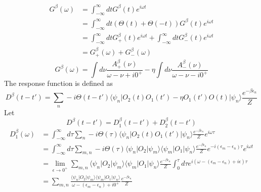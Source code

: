 \documentclass[a4paper,11pt]{article}
\begin{document}
\begin{equation*}
  \begin{split}
     G^\beta(\omega)&=\int_{-\infty}^{\infty}dtG^\beta(t)e^{i\omega t}\\
     &=\int_{-\infty}^{\infty}dt(\Theta(t)+\Theta(-t))G^\beta(t)e^{i\omega t}\\
     &=\int_{-\infty}^{\infty}dtG_+^\beta(t)e^{i\omega t}+\int_{-\infty}^{\infty}dtG_-^\beta(t)e^{i\omega t}\\
     &=G_+^\beta(\omega)+G_-^\beta(\omega)
  \end{split}
\end{equation*}
\begin{equation*}
  G^\beta(\omega)=\int d\nu\frac{A_+^\beta(\nu)}{\omega-\nu+i0^+}-\eta\int d\nu\frac{A_-^\beta(\nu)}{\omega-\nu-i0^+}
\end{equation*}
The response function is defined as
\begin{equation*}
  D^\beta(t-t')=\sum_{n}-i\Theta(t-t')\langle\psi_n|O_2(t)O_1(t')-\eta O_1(t')O(t)|\psi_n\rangle\frac{e^{-\beta\epsilon_n}}{Z}
\end{equation*}
Let
\begin{equation*}
  D^\beta(t-t')=D_1^\beta(t-t')+D_2^\beta(t-t')
\end{equation*}
\begin{equation*}
  \begin{split}
     D_1^\beta(\omega)&=\int_{-\infty}^{\infty} d\tau\sum_{n}-i\Theta(\tau)\langle\psi_n|O_2(t)O_1(t')|\psi_n\rangle\frac{e^{-\beta\epsilon_n}}{Z}e^{i\omega \tau}\\
       &=\int_{-\infty}^{\infty} d\tau\sum_{m,n}-i\Theta(\tau)\langle\psi_n|O_2|\psi_m\rangle\langle\psi_m|O_1|\psi_n\rangle\frac{e^{-\beta\epsilon_n}}{Z}e^{-i(\epsilon_m-\epsilon_n)\tau}e^{i\omega t}\\
       &=\lim_{\epsilon\to0^+}\sum_{m,n}\langle\psi_n|O_2|\psi_m\rangle\langle\psi_m|O_1|\psi_n\rangle\frac{e^{-\beta\epsilon_n}}{Z}\int_{0}^{\tau}d\tau e^{i(\omega-(\epsilon_m-\epsilon_n)+i\epsilon)\tau}\\
       &=\sum_{m,n}\frac{\langle\psi_n|O_2|\psi_m\rangle\langle\psi_m|O_1|\psi_n\rangle}{\omega-(\epsilon_m-\epsilon_n)+i0^+}\frac{e^{-\beta\epsilon_n}}{Z}
  \end{split}
\end{equation*}
\end{document}
